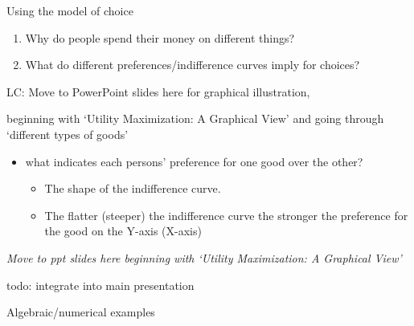 \documentclass[table]{beamer}
\providecommand{\tightlist}{%
  \setlength{\itemsep}{0pt}\setlength{\parskip}{0pt}}
\begin{document}
\begin{frame}{Using the model of choice}
\protect\hypertarget{using-the-model-of-choice}{}

\begin{enumerate}
\tightlist
\item
  Why do people spend their money on different things?
\item
  What do different preferences/indifference curves imply for choices?
\end{enumerate}

LC: Move to PowerPoint slides here for graphical illustration,

beginning with `Utility Maximization: A Graphical View' and going
through `different types of goods'

\begin{itemize}
\item
  what indicates each persons' preference for one good over the other?

  \begin{itemize}
  \item
    The shape of the indifference curve.
  \item
    The flatter (steeper) the indifference curve the stronger the
    preference for the good on the Y-axis (X-axis)
  \end{itemize}
\end{itemize}

\end{frame}

\begin{frame}

\emph{Move to ppt slides here beginning with `Utility Maximization: A
Graphical View'}

todo: integrate into main presentation

\end{frame}

\begin{frame}{Algebraic/numerical examples}
\protect\hypertarget{algebraicnumerical-examples}{}

\end{frame}
\end{document}
